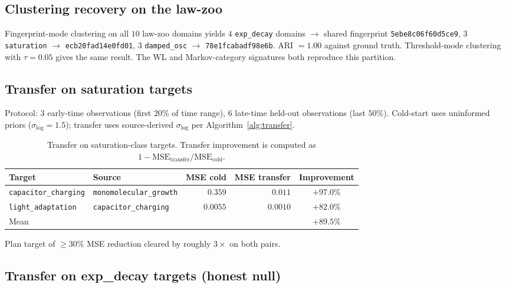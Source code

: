 \documentclass{article}
\begin{document}
\subsection{Clustering recovery on the law-zoo}
\label{sec:exp-clustering}

Fingerprint-mode clustering on all $10$ law-zoo domains yields
$4$ \texttt{exp\_decay} domains $\to$ shared fingerprint
\texttt{5ebe8c06f60d5ce9}, $3$ \texttt{saturation} $\to$
\texttt{ecb20fad14e0fd01}, $3$ \texttt{damped\_osc} $\to$
\texttt{78e1fcabadf98e6b}. ARI $= 1.00$ against ground truth.
Threshold-mode clustering with $\tau = 0.05$ gives the same result.
The WL and Markov-category signatures both reproduce this partition.

\subsection{Transfer on saturation targets}
\label{sec:transfer-saturation}

Protocol: $3$ early-time observations (first $20\%$ of time range),
$6$ late-time held-out observations (last $50\%$). Cold-start uses
uninformed priors ($\sigma_{\log} = 1.5$); transfer uses source-derived
$\sigma_{\log}$ per Algorithm~\ref{alg:transfer}.

\begin{table}[h]
\centering
\caption{Transfer on saturation-class targets. Transfer improvement is
computed as $1 - \mathrm{MSE}_{\mathrm{transfer}}/\mathrm{MSE}_{\mathrm{cold}}$.}
\label{tab:transfer-saturation}
\begin{tabular}{llrrc}
\toprule
Target                       & Source                  & MSE cold & MSE transfer & Improvement \\
\midrule
\texttt{capacitor\_charging} & \texttt{monomolecular\_growth} & $0.359$  & $0.011$      & $\mathbf{+97.0\%}$ \\
\texttt{light\_adaptation}   & \texttt{capacitor\_charging}   & $0.0055$ & $0.0010$     & $\mathbf{+82.0\%}$ \\
\midrule
\multicolumn{4}{l}{Mean}                                                         & $\mathbf{+89.5\%}$ \\
\bottomrule
\end{tabular}
\end{table}

Plan target of $\geq 30\%$ MSE reduction cleared by roughly
$3\times$ on both pairs.

\subsection{Transfer on exp\_decay targets (honest null)}
\label{sec:transfer-exp-decay-null}
\end{document}

